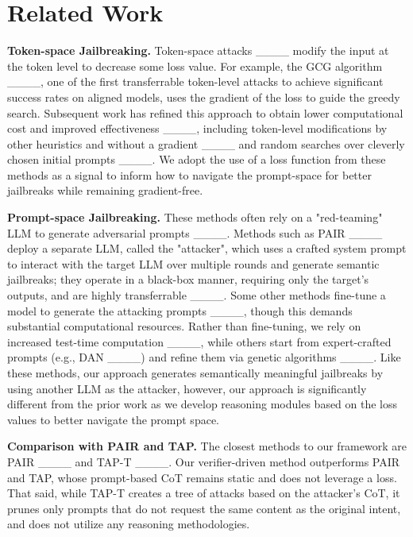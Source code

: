 \section{Related Work}
\label{related}
\textbf{Token-space Jailbreaking.} Token-space attacks ____ modify the input at the token level to decrease some loss value. 
For example, the GCG algorithm ____, one of the first transferrable token-level attacks to achieve significant success rates on aligned models, uses the gradient of the loss to guide the greedy search.
Subsequent work has refined this approach to obtain  lower computational cost and improved effectiveness ____, including token-level modifications by other heuristics and without a gradient ____ and random searches over cleverly chosen initial prompts ____. 
We adopt the use of a loss function from these methods as a signal to inform how to navigate the prompt-space for better jailbreaks while remaining gradient-free. 

\noindent \textbf{Prompt-space Jailbreaking.} These methods often rely on a "red-teaming" LLM to generate adversarial prompts ____. 
Methods such as PAIR ____ deploy a separate LLM, called the "attacker", which uses a crafted system prompt to interact with the target LLM over multiple rounds and generate semantic jailbreaks; they operate in a black-box manner, requiring only the target’s outputs, and are highly transferrable ____.
Some other methods fine-tune a model to generate the attacking prompts ____, though this demands substantial computational resources. Rather than fine-tuning, we rely on increased test-time computation ____, while others start from expert-crafted prompts (e.g., DAN ____) and refine them via genetic algorithms ____. Like these methods, our approach generates semantically meaningful jailbreaks by using another LLM as the attacker, however, our approach is significantly different from the prior work as we develop reasoning modules based on the loss values to better navigate the prompt space.

\noindent \textbf{Comparison with PAIR and TAP.} The closest methods to our framework are PAIR ____ and TAP-T ____. Our verifier-driven method outperforms PAIR and TAP, whose prompt-based CoT remains static and does not leverage a loss. That said, while TAP-T creates a tree of attacks based on the attacker's CoT, it prunes only prompts that do not request the same content as the original intent, and does not utilize any reasoning methodologies. 


